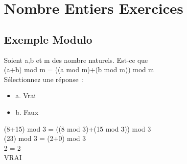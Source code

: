 \newpage

\section{Nombre Entiers Exercices}
\vspace{5mm} %

\subsection{Exemple Modulo}
\vspace{3mm} %

Soient a,b et m des nombre naturels. Est-ce que\\
(a+b) mod m = ((a mod m)+(b mod m)) mod m \\

Sélectionnez une réponse : \\

\begin{itemize}[label=$\square$]
\item {a. Vrai}
\item {b. Faux}
\end{itemize}

(8+15) mod 3 = ((8 mod 3)+(15 mod 3)) mod 3 \\
(23) mod 3 = (2+0) mod 3 \\
2 = 2 \\
VRAI \\
